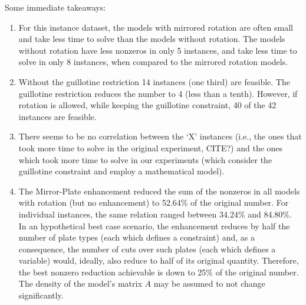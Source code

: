 \documentclass[ppgc,tese,english,formais,babel]{iiufrgs}
\begin{document}
Some immediate takeaways:
\begin{enumerate}
\item For this instance dataset, the models with mirrored rotation are often small and take less time to solve than the models without rotation. The models without rotation have less nonzeros in only 5 instances, and take less time to solve in only 8 instances, when compared to the mirrored rotation models.
\item Without the guillotine restriction 14 instances (one third) are feasible. The guillotine restriction reduces the number to 4 (less than a tenth). However, if rotation is allowed, while keeping the guillotine constraint, 40 of the 42 instances are feasible.
\item There seems to be no correlation between the `X' instances (i.e., the ones that took more time to solve in the original experiment, CITE?) and the ones which took more time to solve in our experiments (which consider the guillotine constraint and employ a mathematical model).
\item The Mirror-Plate enhancement reduced the sum of the nonzeros in all models with rotation (but no enhancement) to 52.64\% of the original number. For individual instances, the same relation ranged between 34.24\% and 84.80\%. In an hypothetical best case scenario, the enhancement reduces by half the number of plate types (each which defines a constraint) and, as a consequence, the number of cuts over such plates (each which defines a variable) would, ideally, also reduce to half of its original quantity. Therefore, the best nonzero reduction achievable is down to 25\% of the original number. The density of the model's matrix \(A\) may be assumed to not change significantly.
\end{enumerate}
\end{document}
